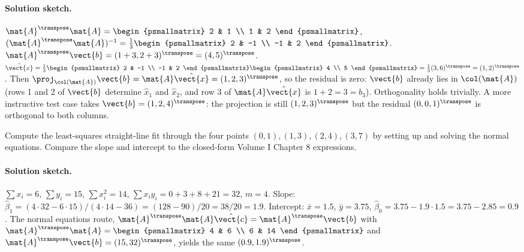 \paragraph{Solution sketch.}
$\mat{A}^{\transpose}\mat{A} = \begin{psmallmatrix} 2 & 1 \\ 1 & 2
\end{psmallmatrix}$, $(\mat{A}^{\transpose}\mat{A})^{-1} =
\frac{1}{3}\begin{psmallmatrix} 2 & -1 \\ -1 & 2 \end{psmallmatrix}$.
$\mat{A}^{\transpose}\vect{b} = (1 + 3, 2 + 3)^{\transpose} = (4,
5)^{\transpose}$. $\hat{\vect{x}} = \frac{1}{3}\begin{psmallmatrix}
2 & -1 \\ -1 & 2 \end{psmallmatrix}\begin{psmallmatrix} 4 \\ 5
\end{psmallmatrix} = \frac{1}{3}(3, 6)^{\transpose} = (1,
2)^{\transpose}$. Then $\proj_{\col(\mat{A})}\vect{b} =
\mat{A}\hat{\vect{x}} = (1, 2, 3)^{\transpose}$, so the residual
is zero: $\vect{b}$ already lies in $\col(\mat{A})$ (rows 1 and 2
of $\vect{b}$ determine $\hat{x}_{1}$ and $\hat{x}_{2}$, and row
3 of $\mat{A}\hat{\vect{x}}$ is $1 + 2 = 3 = b_{3}$). Orthogonality
holds trivially. A more instructive test case takes $\vect{b} =
(1, 2, 4)^{\transpose}$: the projection is still $(1, 2,
3)^{\transpose}$ but the residual $(0, 0, 1)^{\transpose}$ is
orthogonal to both columns.

\begin{exercise}
Compute the least-squares straight-line fit through the four
points $(0,1), (1,3), (2,4), (3,7)$ by setting up and solving the
normal equations. Compare the slope and intercept to the
closed-form Volume I Chapter 8 expressions.
\end{exercise}

\paragraph{Solution sketch.}
$\sum x_{i} = 6$, $\sum y_{i} = 15$, $\sum x_{i}^{2} = 14$,
$\sum x_{i} y_{i} = 0 + 3 + 8 + 21 = 32$, $m = 4$. Slope:
$\hat{\beta}_{1} = (4 \cdot 32 - 6 \cdot 15)/(4 \cdot 14 - 36) =
(128 - 90)/20 = 38/20 = 1.9$. Intercept: $\bar{x} = 1.5$,
$\bar{y} = 3.75$, $\hat{\beta}_{0} = 3.75 - 1.9 \cdot 1.5 = 3.75 -
2.85 = 0.9$. The normal equations route, $\mat{A}^{\transpose}
\mat{A}\hat{\vect{c}} = \mat{A}^{\transpose}\vect{b}$ with
$\mat{A}^{\transpose}\mat{A} = \begin{psmallmatrix} 4 & 6 \\ 6 &
14 \end{psmallmatrix}$ and $\mat{A}^{\transpose}\vect{b} = (15,
32)^{\transpose}$, yields the same $(0.9, 1.9)^{\transpose}$.

